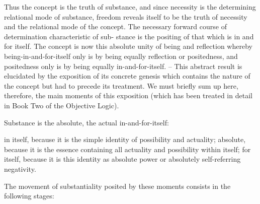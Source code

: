Thus the concept is the truth of substance,
and since necessity is the determining relational mode of substance,
freedom reveals itself to be the truth of necessity and
the relational mode of the concept.
The necessary forward course of determination characteristic of sub-
stance is the positing of that which is in and for itself.
The concept is now this absolute unity of being and reflection whereby being-in-and-for-itself
only is by being equally reflection or positedness, and positedness only is by
being equally in-and-for-itself.
– This abstract result is elucidated by the
exposition of its concrete genesis which contains the nature of the concept
but had to precede its treatment.
We must briefly sum up here, therefore, the main moments of this exposition
(which has been treated in detail in Book Two of the Objective Logic).

Substance is the absolute, the actual in-and-for-itself:

in itself,
because it is the simple identity of possibility and actuality;
absolute,
because it is the essence containing all actuality and possibility within itself;
for itself,
because it is this identity as absolute power or absolutely self-referring negativity.

The movement of substantiality posited by these moments consists in the following stages:

